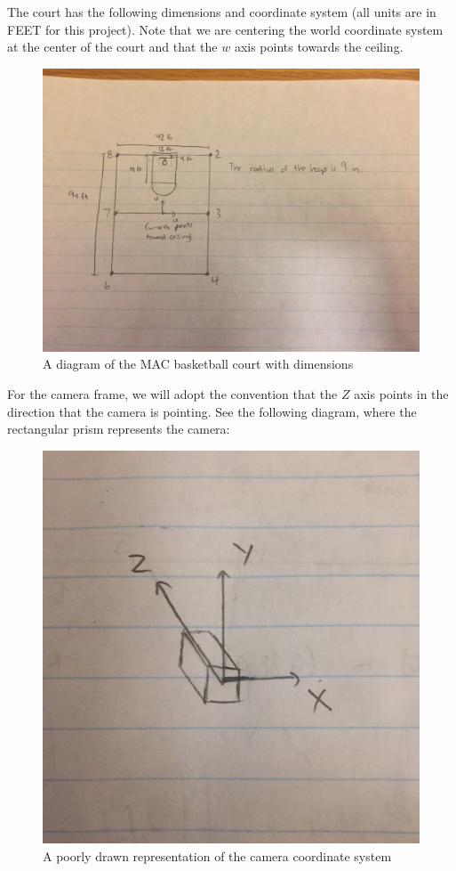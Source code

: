 \documentclass{article}
\begin{document}
The court has the following dimensions and coordinate system (all units are in FEET for this project). Note that we are centering the world coordinate system at the center of the court and that the $w$ axis points towards the ceiling.

\begin{figure}[H]
\includegraphics[scale=0.25]{Court_Diagram}
\centering
\caption{A diagram of the MAC basketball court with dimensions}
\end{figure}

For the camera frame, we will adopt the convention that the $Z$ axis points in the direction that the camera is pointing. See the following diagram, where the rectangular prism represents the camera:

\begin{figure}[H]
\includegraphics[scale=0.1]{Camera_Coordinates}
\centering
\caption{A poorly drawn representation of the camera coordinate system}
\end{figure}
\end{document}
